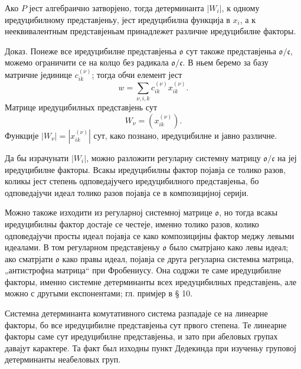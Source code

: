﻿\documentclass[11pt]{article}
\providecommand{\mo}{\mathfrak{o}}
\providecommand{\mc}{\mathfrak{c}}
\begin{document}
Ако $P$ јест алгебраично затворјено, тогда детерминанта $|W_i|$, к одному иредуцибилному представјеньу, јест иредуцибилна функција в $x_i$, а к нееквивалентным представјеньам принадлежет различне иредуцибилне факторы.

Доказ. Понеже все иредуцибилне представјеньа $\mo$ сут такоже представјеньа $\mo/\mc$, можемо ограничити се на колцо без радикала $\mo/\mc$. В ньем беремо за базу матричне јединице $c_{ik}^{(\nu)}$; тогда обчи елемент јест
\[
        w=\sum_{\nu,i,k}c_{ik}^{(\nu)}x_{ik}^{(\nu)}.
\]
Матрице иредуцибилных представјень сут
\[
        W_\nu=(x_{ik}^{(\nu)}).
\]
Функције $|W_\nu|=|x_{ik}^{(\nu)}|$ сут, како познано, иредуцибилне и јавно различне.

Да бы израчунати $|W_i|$, можно разложити регуларну системну матрицу $\mo/\mc$ на јеј иредуцибилне факторы. Всакы иредуцибилны фактор појавја се толико разов, коликы јест степень одповедајучего иредуцибилного представјеньа, бо одповедајучи идеал толико разов појавја се в композицијној серији.

Можно такоже изходити из регуларној системној матрице $\mo$, но тогда всакы иредуцибилны фактор достаје се честеје, именно толико разов, колико одповедајучи просты идеал појавја се како композицијны фактор меджу левыми идеалами. В том регуларном представјеньу $\mo$ было сматрјано како левы идеал; ако сматрјати $\mo$ како правы идеал, појавја се друга регуларна системна матрица, „антистрофна матрица“ при Фробениусу. Она содржи те саме иредуцибилне факторы, именно системне детерминанты всех иредуцибилных представјень, але можно с другыми експонентами; гл. примјер в § 10.

Системна детерминанта комутативного система разпадаје се на линеарне факторы, бо все иредуцибилне представјеньа сут првого степена. Те линеарне факторы саме сут иредуцибилне представјеньа, и зато при абеловых групах давајут карактере. Та факт был изходны пункт Дедекинда при изученьу груповој детерминанты неабеловых груп.
\end{document}
